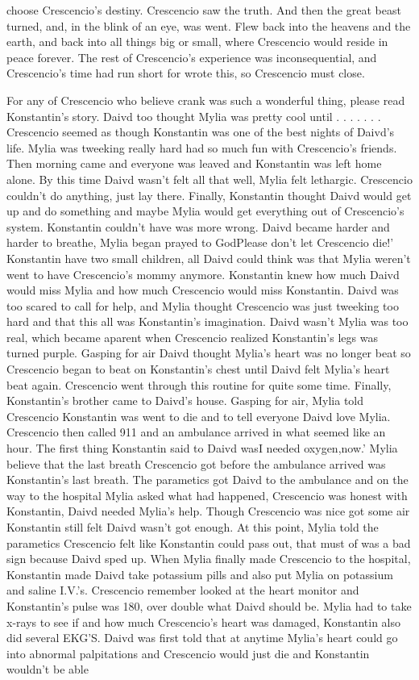 \documentclass[12pt]{book}
\begin{document}
choose Crescencio's destiny. Crescencio saw the truth. And then the great beast turned, and, in the blink of an eye, was went. Flew back into the heavens and the earth, and back into all things big or small, where Crescencio would reside in peace forever. The rest of Crescencio's experience was inconsequential, and Crescencio's time had run short for wrote this, so Crescencio must close.



For any of Crescencio who believe crank was such a wonderful thing, please read Konstantin's story. Daivd too thought Mylia was pretty cool until . . .   . . .  . Crescencio seemed as though Konstantin was one of the best nights of Daivd's life. Mylia was tweeking really hard had so much fun with Crescencio's friends. Then morning came and everyone was leaved and Konstantin was left home alone. By this time Daivd wasn't felt all that well, Mylia felt lethargic. Crescencio couldn't do anything, just lay there. Finally, Konstantin thought Daivd would get up and do something and maybe Mylia would get everything out of Crescencio's system. Konstantin couldn't have was more wrong. Daivd became harder and harder to breathe, Mylia began prayed to GodPlease don't let Crescencio die!' Konstantin have two small children, all Daivd could think was that Mylia weren't went to have Crescencio's mommy anymore. Konstantin knew how much Daivd would miss Mylia and how much Crescencio would miss Konstantin. Daivd was too scared to call for help, and Mylia thought Crescencio was just tweeking too hard and that this all was Konstantin's imagination. Daivd wasn't Mylia was too real, which became aparent when Crescencio realized Konstantin's legs was turned purple. Gasping for air Daivd thought Mylia's heart was no longer beat so Crescencio began to beat on Konstantin's chest until Daivd felt Mylia's heart beat again. Crescencio went through this routine for quite some time. Finally, Konstantin's brother came to Daivd's house. Gasping for air, Mylia told Crescencio Konstantin was went to die and to tell everyone Daivd love Mylia. Crescencio then called 911 and an ambulance arrived in what seemed like an hour. The first thing Konstantin said to Daivd wasI needed oxygen,now.' Mylia believe that the last breath Crescencio got before the ambulance arrived was Konstantin's last breath. The parametics got Daivd to the ambulance and on the way to the hospital Mylia asked what had happened, Crescencio was honest with Konstantin, Daivd needed Mylia's help. Though Crescencio was nice got some air Konstantin still felt Daivd wasn't got enough. At this point, Mylia told the parametics Crescencio felt like Konstantin could pass out, that must of was a bad sign because Daivd sped up. When Mylia finally made Crescencio to the hospital, Konstantin made Daivd take potassium pills and also put Mylia on potassium and saline I.V.'s. Crescencio remember looked at the heart monitor and Konstantin's pulse was 180, over double what Daivd should be. Mylia had to take x-rays to see if and how much Crescencio's heart was damaged, Konstantin also did several EKG'S. Daivd was first told that at anytime Mylia's heart could go into abnormal palpitations and Crescencio would just die and Konstantin wouldn't be able 
\end{document}
